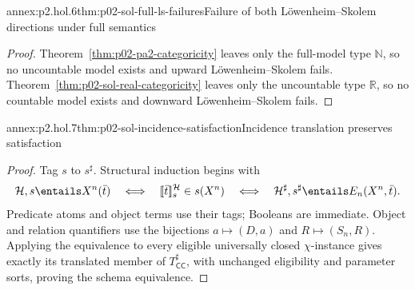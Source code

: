 \begin{annexitem}{annex:p2.hol.6}{thm:p02-sol-full-ls-failures}{Failure of both L\"owenheim--Skolem directions under full semantics}
\begin{proof}
Theorem~\ref{thm:p02-pa2-categoricity} leaves only the full-model type
\(\mathbb N\), so no uncountable model exists and upward
L\"owenheim--Skolem fails.  Theorem~\ref{thm:p02-sol-real-categoricity} leaves
only the uncountable type \(\mathbb R\), so no countable model exists and
downward L\"owenheim--Skolem fails.
\end{proof}
\end{annexitem}

\begin{annexitem}{annex:p2.hol.7}{thm:p02-sol-incidence-satisfaction}{Incidence translation preserves satisfaction}
\begin{proof}
Tag \(s\) to \(s^\sharp\).  Structural induction begins with
\[
 \mathcal H,s\entails X^n(\bar t)
 \quad\Longleftrightarrow\quad
 \lbrack\!\lbrack\bar t\rbrack\!\rbrack_s^{\mathcal H}\in s(X^n)
 \quad\Longleftrightarrow\quad
 \mathcal H^\sharp,s^\sharp\entails E_n(X^n,\bar t).
\]
Predicate atoms and object terms use their tags; Booleans are immediate.
Object and relation quantifiers use the bijections
\(a\mapsto(D,a)\) and \(R\mapsto(S_n,R)\).  Applying the equivalence to every
eligible universally closed \(\chi\)-instance gives exactly its translated
member of \(T_{\mathsf{CC}}^\sharp\), with unchanged eligibility and parameter
sorts, proving the schema equivalence.
\end{proof}
\end{annexitem}

